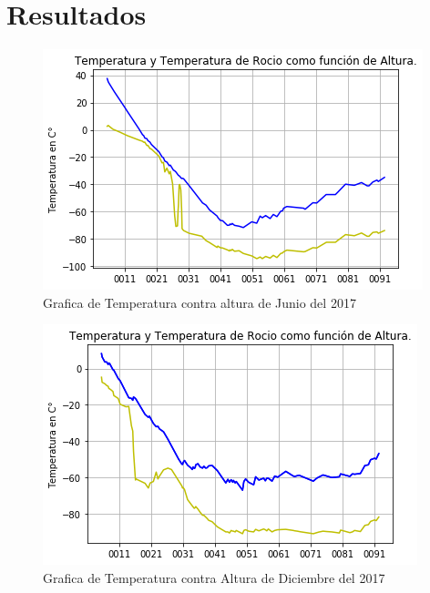 \documentclass{article}
\begin{document}
\newpage

\section{Resultados}

\begin{figure}
\includegraphics[width=\linewidth]{TemperaturasJun.png}
\caption{Grafica de Temperatura contra altura de Junio del 2017}
\centering
\end{figure}

\begin{figure}
\includegraphics[width=\linewidth]{TemperaturasDic.png}
\caption{Grafica de Temperatura contra Altura de Diciembre del 2017}
\end{figure}
\end{document}

